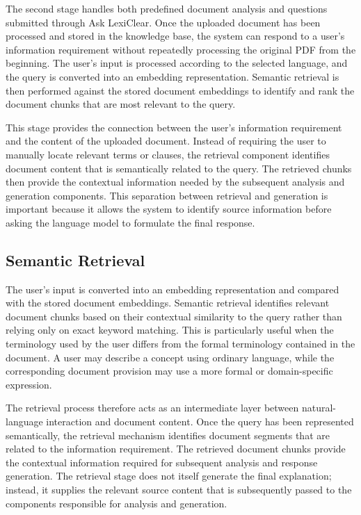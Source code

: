 \documentclass[12pt,a4paper,oneside]{report}
\begin{document}
The second stage handles both predefined document analysis and questions
submitted through Ask LexiClear. Once the uploaded document has been
processed and stored in the knowledge base, the system can respond to a
user's information requirement without repeatedly processing the original
PDF from the beginning. The user's input is processed according to the
selected language, and the query is converted into an embedding
representation. Semantic retrieval is then performed against the stored
document embeddings to identify and rank the document chunks that are most
relevant to the query.

This stage provides the connection between the user's information
requirement and the content of the uploaded document. Instead of requiring
the user to manually locate relevant terms or clauses, the retrieval
component identifies document content that is semantically related to the
query. The retrieved chunks then provide the contextual information needed
by the subsequent analysis and generation components. This separation
between retrieval and generation is important because it allows the system
to identify source information before asking the language model to formulate
the final response.

\subsection{Semantic Retrieval}

The user's input is converted into an embedding representation and compared
with the stored document embeddings. Semantic retrieval identifies relevant
document chunks based on their contextual similarity to the query rather
than relying only on exact keyword matching. This is particularly useful
when the terminology used by the user differs from the formal terminology
contained in the document. A user may describe a concept using ordinary
language, while the corresponding document provision may use a more formal
or domain-specific expression.

The retrieval process therefore acts as an intermediate layer between
natural-language interaction and document content. Once the query has been
represented semantically, the retrieval mechanism identifies document
segments that are related to the information requirement. The retrieved
document chunks provide the contextual information required for subsequent
analysis and response generation. The retrieval stage does not itself
generate the final explanation; instead, it supplies the relevant source
content that is subsequently passed to the components responsible for
analysis and generation.
\end{document}
